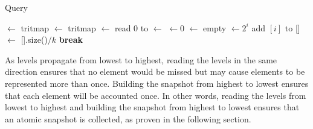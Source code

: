  
\begin{algorithm}[h]
\caption{Query} \label{alg:sl_query}
\begin{algorithmic}[1]
\setcounter{ALG@line}{\value{mycounter}}
    \State {} $\gets$ tritmap \label{Line:read_current_stream}
     \label{Line:check_rho}
        \State {} \label{Line:query_from_cache}
    \EndIf
    \Repeat \label{Line:start_collect_levels}
        \State {} $\gets$ tritmap
        \State {} $\gets$ read  $0$ to  \label{Line: read_snap}
        \State {} $\gets$  \label{Line: second-collect}
      \label{Line:query_linearization}
    \State {} $\gets 0$ \label{line: query_estimate_start}
    \State {} $\gets$ empty 
     \label{Line:start_collect_snapshot}
        \State {} $\gets 2^i $
         \label{Line:add_to_snapshot}
            \State add $[i]$ to  \label{Line:add_level_to_snapshot}
            \State {}[] $\gets$ [].size()$ / k$  \label{Line:update_myTrit} \label{line: query_estimate_end}
                \State \textbf{break}
            \EndIf
        \EndIf
    \EndFor \label{line:snapshot_done}
    \State {} \label{Line:query_result}
\EndProcedure
\setcounter{mycounter}{\value{ALG@line}}
\end{algorithmic}
\end{algorithm}


As levels propagate from lowest to highest, reading the levels in the same direction ensures that no element would be missed but may cause elements to be represented more than once. Building the snapshot from highest to lowest ensures that each element will be accounted once. 
In other words, reading the levels from lowest to highest and building the snapshot from highest to lowest ensures that an atomic snapshot is collected, as proven in the following section. 


